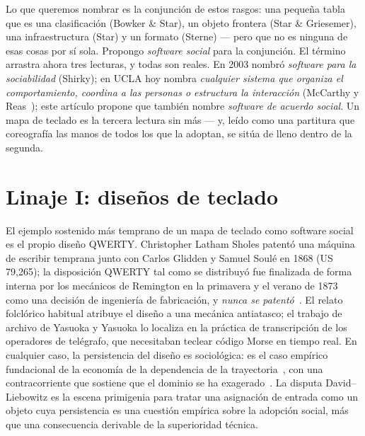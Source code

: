 \documentclass[10pt,letterpaper,twocolumn]{article}
\begin{document}
Lo que queremos nombrar es la conjunción de estos rasgos: una pequeña tabla que es una clasificación (Bowker \& Star), un objeto frontera (Star \& Griesemer), una infraestructura (Star) y un formato (Sterne) --- pero que no es ninguna de esas cosas por sí sola. Propongo \emph{software social} para la conjunción. El término arrastra ahora tres lecturas, y todas son reales. En 2003 nombró \emph{software para la sociabilidad} (Shirky); en UCLA hoy nombra \emph{cualquier sistema que organiza el comportamiento, coordina a las personas o estructura la interacción} (McCarthy y Reas~\citep{sosoft_info}); este artículo propone que también nombre \emph{software de acuerdo social}. Un mapa de teclado es la tercera lectura sin más --- y, leído como una partitura que coreografía las manos de todos los que la adoptan, se sitúa de lleno dentro de la segunda.

\section{Linaje I: diseños de teclado}
\label{sec:lineage1}

El ejemplo sostenido más temprano de un mapa de teclado como software social es el propio diseño QWERTY. Christopher Latham Sholes patentó una máquina de escribir temprana junto con Carlos Glidden y Samuel Soulé en 1868 (US 79{,}265); la disposición QWERTY tal como se distribuyó fue finalizada de forma interna por los mecánicos de Remington en la primavera y el verano de 1873 como una decisión de ingeniería de fabricación, y \emph{nunca se patentó}~\citep{yasuoka2011prehistory}. El relato folclórico habitual atribuye el diseño a una mecánica antiatasco; el trabajo de archivo de Yasuoka y Yasuoka lo localiza en la práctica de transcripción de los operadores de telégrafo, que necesitaban teclear código Morse en tiempo real. En cualquier caso, la persistencia del diseño es sociológica: es el caso empírico fundacional de la economía de la dependencia de la trayectoria~\citep{david1985qwerty,arthur1989competing}, con una contracorriente que sostiene que el dominio se ha exagerado~\citep{liebowitz1990fable}. La disputa David--Liebowitz es la escena primigenia para tratar una asignación de entrada como un objeto cuya persistencia es una cuestión empírica sobre la adopción social, más que una consecuencia derivable de la superioridad técnica.
\end{document}
